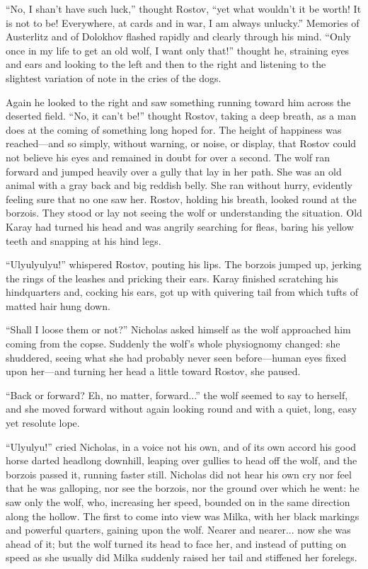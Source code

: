 ``No, I shan't have such luck,'' thought Rostov, ``yet what
wouldn't it be worth! It is not to be! Everywhere, at cards and
in war, I am always unlucky.'' Memories of Austerlitz and of
Dolokhov flashed rapidly and clearly through his mind. ``Only
once in my life to get an old wolf, I want only that!'' thought
he, straining eyes and ears and looking to the left and then to
the right and listening to the slightest variation of note in the
cries of the dogs.

Again he looked to the right and saw something running toward him
across the deserted field. ``No, it can't be!'' thought Rostov,
taking a deep breath, as a man does at the coming of something
long hoped for. The height of happiness was reached---and so
simply, without warning, or noise, or display, that Rostov could
not believe his eyes and remained in doubt for over a second. The
wolf ran forward and jumped heavily over a gully that lay in her
path. She was an old animal with a gray back and big reddish
belly. She ran without hurry, evidently feeling sure that no one
saw her. Rostov, holding his breath, looked round at the borzois.
They stood or lay not seeing the wolf or understanding the
situation.  Old Karay had turned his head and was angrily
searching for fleas, baring his yellow teeth and snapping at his
hind legs.

``Ulyulyulyu!'' whispered Rostov, pouting his lips. The borzois
jumped up, jerking the rings of the leashes and pricking their
ears. Karay finished scratching his hindquarters and, cocking his
ears, got up with quivering tail from which tufts of matted hair
hung down.

``Shall I loose them or not?'' Nicholas asked himself as the wolf
approached him coming from the copse. Suddenly the wolf's whole
physiognomy changed: she shuddered, seeing what she had probably
never seen before---human eyes fixed upon her---and turning her
head a little toward Rostov, she paused.

``Back or forward? Eh, no matter, forward...'' the wolf seemed to
say to herself, and she moved forward without again looking round
and with a quiet, long, easy yet resolute lope.

``Ulyulyu!'' cried Nicholas, in a voice not his own, and of its
own accord his good horse darted headlong downhill, leaping over
gullies to head off the wolf, and the borzois passed it, running
faster still. Nicholas did not hear his own cry nor feel that he
was galloping, nor see the borzois, nor the ground over which he
went: he saw only the wolf, who, increasing her speed, bounded on
in the same direction along the hollow.  The first to come into
view was Milka, with her black markings and powerful quarters,
gaining upon the wolf. Nearer and nearer... now she was ahead of
it; but the wolf turned its head to face her, and instead of
putting on speed as she usually did Milka suddenly raised her
tail and stiffened her forelegs.

